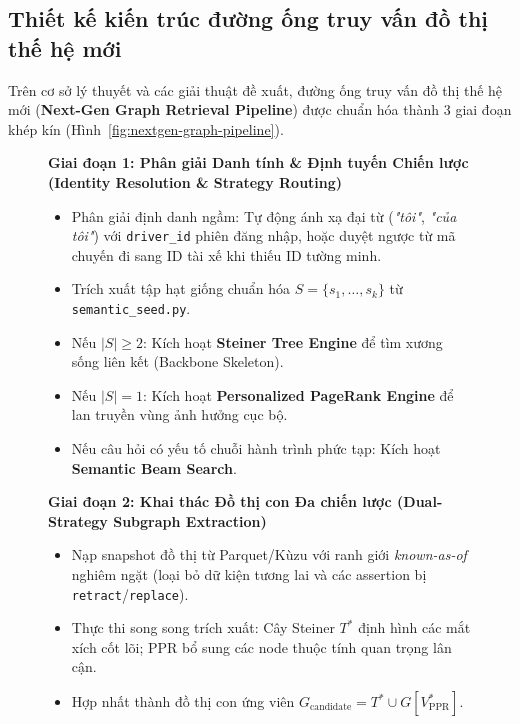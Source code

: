 \documentclass[a4paper,11pt]{article}
\begin{document}
\subsection{Thiết kế kiến trúc đường ống truy vấn đồ thị thế hệ mới}
\label{sec:nextgen-pipeline}

Trên cơ sở lý thuyết và các giải thuật đề xuất, đường ống truy vấn đồ thị thế hệ mới (\textbf{Next-Gen Graph Retrieval Pipeline}) được chuẩn hóa thành 3 giai đoạn khép kín (Hình~\ref{fig:nextgen-graph-pipeline}).

\begin{figure}[htbp]
\centering
\begin{tcolorbox}[
    colback=subtlebg, colframe=brandblue, width=\textwidth,
    title={\small\bfseries\color{white} LUỒNG TRUY VẤN ĐỒ THỊ THẾ HỆ MỚI (NEXT-GEN GRAPH RETRIEVAL PIPELINE)},
    fonttitle=\bfseries
]
\small
\textbf{Giai đoạn 1: Phân giải Danh tính & Định tuyến Chiến lược (Identity Resolution \& Strategy Routing)}
\begin{itemize}[noitemsep,topsep=2pt]
    \item Phân giải định danh ngầm: Tự động ánh xạ đại từ (\textit{"tôi"}, \textit{"của tôi"}) với \texttt{driver\_id} phiên đăng nhập, hoặc duyệt ngược từ mã chuyến đi sang ID tài xế khi thiếu ID tường minh.
    \item Trích xuất tập hạt giống chuẩn hóa $S = \{s_1, \dots, s_k\}$ từ \nolinkurl{semantic_seed.py}.
    \item Nếu $|S| \ge 2$: Kích hoạt \textbf{Steiner Tree Engine} để tìm xương sống liên kết (Backbone Skeleton).
    \item Nếu $|S| = 1$: Kích hoạt \textbf{Personalized PageRank Engine} để lan truyền vùng ảnh hưởng cục bộ.
    \item Nếu câu hỏi có yếu tố chuỗi hành trình phức tạp: Kích hoạt \textbf{Semantic Beam Search}.
\end{itemize}

\vspace{0.15cm}
\textbf{Giai đoạn 2: Khai thác Đồ thị con Đa chiến lược (Dual-Strategy Subgraph Extraction)}
\begin{itemize}[noitemsep,topsep=2pt]
    \item Nạp snapshot đồ thị từ Parquet/Kùzu với ranh giới \textit{known-as-of} nghiêm ngặt (loại bỏ dữ kiện tương lai và các assertion bị \texttt{retract}/\texttt{replace}).
    \item Thực thi song song trích xuất: Cây Steiner $T^*$ định hình các mắt xích cốt lõi; PPR bổ sung các node thuộc tính quan trọng lân cận.
    \item Hợp nhất thành đồ thị con ứng viên $G_{\text{candidate}} = T^* \cup G[V^*_{\text{PPR}}]$.
\end{itemize}


\end{tcolorbox}
\end{figure}
\end{document}

